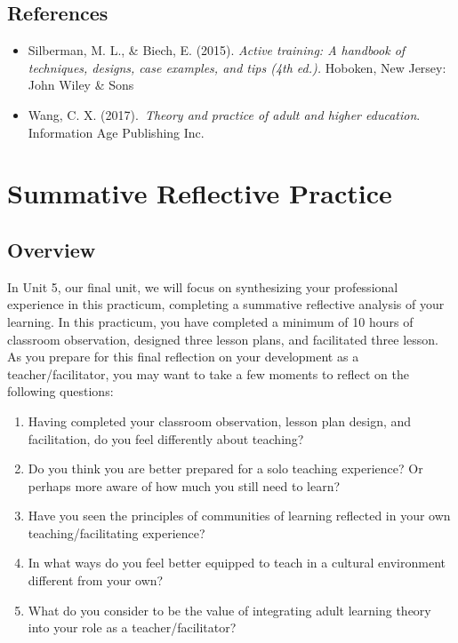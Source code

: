 \documentclass[
]{book}
\providecommand{\tightlist}{%
  \setlength{\itemsep}{0pt}\setlength{\parskip}{0pt}}
\begin{document}
\hypertarget{references-3}{%
\section*{References}\label{references-3}}

\begin{itemize}
\tightlist
\item
  Silberman, M. L., \& Biech, E. (2015). \emph{Active training: A handbook of techniques, designs, case examples, and tips (4th ed.).} Hoboken, New Jersey: John Wiley \& Sons\\
\item
  Wang, C. X. (2017).~\emph{Theory and practice of adult and higher education}. Information Age Publishing Inc.~
\end{itemize}

\hypertarget{summative-reflective-practice}{%
\chapter{Summative Reflective Practice}\label{summative-reflective-practice}}

\hypertarget{overview-5}{%
\section*{Overview}\label{overview-5}}

In Unit 5, our final unit, we will focus on synthesizing your professional experience in this practicum, completing a summative reflective analysis of your learning. In this practicum, you have completed a minimum of 10 hours of classroom observation, designed three lesson plans, and facilitated three lesson. As you prepare for this final reflection on your development as a teacher/facilitator, you may want to take a few moments to reflect on the following questions:

\begin{enumerate}
\def\labelenumi{\arabic{enumi}.}
\tightlist
\item
  Having completed your classroom observation, lesson plan design, and facilitation, do you feel differently about teaching?\\
\item
  Do you think you are better prepared for a solo teaching experience? Or perhaps more aware of how much you still need to learn?\\
\item
  Have you seen the principles of communities of learning reflected in your own teaching/facilitating experience?\\
\item
  In what ways do you feel better equipped to teach in a cultural environment different from your own?\\
\item
  What do you consider to be the value of integrating adult learning theory into your role as a teacher/facilitator?
\end{enumerate}
\end{document}
